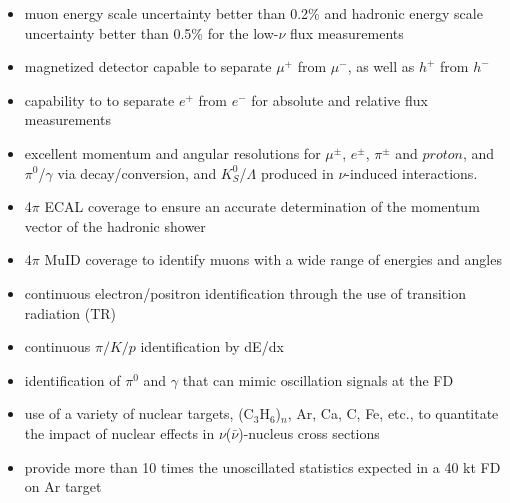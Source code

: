 \begin{itemize}
\item muon energy scale uncertainty better than 0.2\% and hadronic energy scale uncertainty 
better than 0.5\% for the low-$\nu$ flux measurements 

\item 
magnetized detector capable to separate $\mu^+$ from $\mu^-$, as well as $h^+$ from $h^-$ 

\item 
capability to to separate $e^+$ from $e^-$ for absolute and relative flux measurements



\item excellent momentum and angular resolutions for $\mu^{\pm}$, $e^{\pm}$, 
$\pi^{\pm}$ and $proton$, and $\pi^0$/$\gamma$ via decay/conversion, 
 and $K^0_S$/$\Lambda$ produced in $\nu$-induced interactions. 

\item 4$\pi$ ECAL coverage to ensure an  
 accurate determination of the momentum vector of the hadronic shower

\item 4$\pi$ MuID coverage to identify muons with a wide range of energies and angles  

\item continuous electron/positron identification through the use of transition radiation (TR) 

\item continuous $\pi/K/p$ identification by dE/dx 

\item 
identification of $\pi^0$ and $\gamma$ that can mimic oscillation signals at the FD 

\item use of a variety of nuclear targets, (C$_3$H$_6$)$_n$, Ar, Ca, C, Fe, etc., to quantitate the impact of nuclear 
effects in $\nu$($\bar \nu$)-nucleus cross sections  

\item provide more than 10 times the unoscillated statistics expected in a 40 kt FD on Ar target

\end{itemize}
